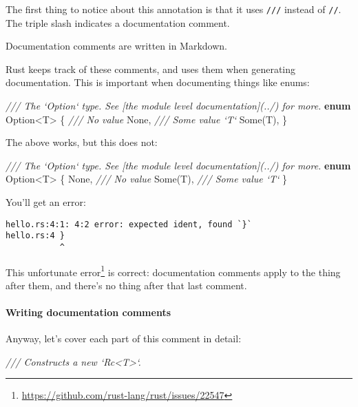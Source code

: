 \documentclass[a4paper,]{book}
\newenvironment{Shaded}{\begin{snugshade}}{\end{snugshade}}
\newcommand{\KeywordTok}[1]{\textcolor[rgb]{0.13,0.29,0.53}{\textbf{{#1}}}}
\newcommand{\DataTypeTok}[1]{\textcolor[rgb]{0.13,0.29,0.53}{{#1}}}
\newcommand{\ConstantTok}[1]{\textcolor[rgb]{0.00,0.00,0.00}{{#1}}}
\newcommand{\CommentTok}[1]{\textcolor[rgb]{0.56,0.35,0.01}{\textit{{#1}}}}
\newcommand{\NormalTok}[1]{{#1}}
\renewcommand{\href}[2]{#2\footnote{\url{#1}}}
\let\oldparagraph\paragraph
\renewcommand{\paragraph}[1]{\oldparagraph{#1}\mbox{}}
\begin{document}
The first thing to notice about this annotation is that it uses
\texttt{///} instead of \texttt{//}. The triple slash indicates a
documentation comment.

Documentation comments are written in Markdown.

Rust keeps track of these comments, and uses them when generating
documentation. This is important when documenting things like enums:

\begin{Shaded}
\begin{Highlighting}[]
\CommentTok{/// The `Option` type. See [the module level documentation](../) for more.}
\KeywordTok{enum} \DataTypeTok{Option}\NormalTok{<T> \{}
    \CommentTok{/// No value}
    \ConstantTok{None}\NormalTok{,}
    \CommentTok{/// Some value `T`}
    \ConstantTok{Some}\NormalTok{(T),}
\NormalTok{\}}
\end{Highlighting}
\end{Shaded}

The above works, but this does not:

\begin{Shaded}
\begin{Highlighting}[]
\CommentTok{/// The `Option` type. See [the module level documentation](../) for more.}
\KeywordTok{enum} \DataTypeTok{Option}\NormalTok{<T> \{}
    \ConstantTok{None}\NormalTok{, }\CommentTok{/// No value}
    \ConstantTok{Some}\NormalTok{(T), }\CommentTok{/// Some value `T`}
\NormalTok{\}}
\end{Highlighting}
\end{Shaded}

You'll get an error:

\begin{verbatim}
hello.rs:4:1: 4:2 error: expected ident, found `}`
hello.rs:4 }
           ^
\end{verbatim}

This \href{https://github.com/rust-lang/rust/issues/22547}{unfortunate
error} is correct: documentation comments apply to the thing after them,
and there's no thing after that last comment.

\paragraph{Writing documentation
comments}\label{writing-documentation-comments}

Anyway, let's cover each part of this comment in detail:

\begin{Shaded}
\begin{Highlighting}[]
\CommentTok{/// Constructs a new `Rc<T>`.}
\end{Highlighting}
\end{Shaded}
\end{document}
